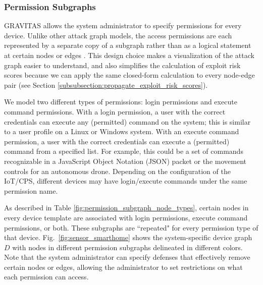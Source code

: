\documentclass[10pt,journal,compsoc]{IEEEtran}
\begin{document}
\subsubsection{Permission Subgraphs}
\label{subsubsection:permission_subgraphs}

GRAVITAS allows the system administrator to specify permissions for every device. Unlike other attack graph models, the access permissions are each represented by a separate copy of a subgraph rather than as a logical statement at certain nodes or edges \cite{kordy2014, ou2012, noel2010}. This design choice makes a visualization of the attack graph easier to understand, and also simplifies the calculation of exploit risk scores because we can apply the same closed-form calculation to every node-edge pair (see Section \ref{subsubsection:propagate_exploit_risk_scores}).

\par We model two different types of permissions: login permissions and execute command permissions. 
With a login permission, a user with the correct credentials can execute any (permitted) command on 
the system; this is similar to a user profile on a Linux or Windows system. With an execute command 
permission, a user with the correct credentials can execute a (permitted) command from a specified 
list. For example, this could be a set of commands recognizable in a JavaScript Object Notation (JSON) packet or the movement controls for an autonomous drone. Depending on the configuration of the IoT/CPS, different devices may have login/execute commands under the same permission name. 

\par As described in Table \ref{fig:permission_subgraph_node_types}, certain nodes in every device 
template are associated with login permissions, execute command permissions, or both. These subgraphs 
are ``repeated"  for every permission type of that device.   Fig.~\ref{fig:sensor_smarthome} shows the system-specific device graph 
$D$ with nodes in different permission subgraphs delineated in different colors. Note that the system administrator can specify defenses that effectively remove certain nodes or edges, allowing the administrator to set restrictions on what each permission can access.
\end{document}

